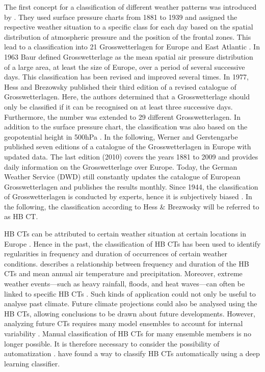 \documentclass[
]{krantz}
\begin{document}
The first concept for a classification of different weather patterns was introduced by \citet{Baur1944}.
They used surface pressure charts from 1881 to 1939 and assigned the respective weather situation to a specific class for each day based on the spatial distribution of atmospheric pressure and the position of the frontal zones.
This lead to a classification into 21 Grosswetterlagen for Europe and East Atlantic \citep{Baur1944}.
In 1963 Baur defined Grosswetterlage as the mean spatial air pressure distribution of a large area, at least the size of Europe, over a period of several successive days.
This classification has been revised and improved several times. In 1977, Hess and Brezowsky published their third edition of a revised catalogue of Grosswetterlagen.
Here, the authors determined that a Grosswetterlage should only be classified if it can be recognised on at least three successive days.
Furthermore, the number was extended to 29 different Grosswetterlagen.
In addition to the surface pressure chart, the classification was also based on the geopotential height in 500hPa \citep{Bissolli2001, Bissolli2001b, Werner2010}.
In the following, Werner and Gerstengarbe published seven editions of a catalogue of the Grosswetterlagen in Europe with updated data.
The last edition (2010) covers the years 1881 to 2009 and provides daily information on the Grosswetterlage over Europe.
Today, the German Weather Service (DWD) still constantly updates the catalogue of European Grosswetterlagen and publishes the results monthly.
Since 1944, the classification of Grosswetterlagen is conducted by experts, hence it is subjectively biased \citep{Hess2005katalog}.
In the following, the classification according to Hess \& Brezwosky will be referred to as HB CT.

HB CTs can be attributed to certain weather situation at certain locations in Europe \citep{Werner2010}.
Hence in the past, the classification of HB CTs has been used to identify regularities in frequency and duration of occurrences of certain weather conditions.
\citet{Bissolli2001} describes a relationship between frequency and duration of the HB CTs and mean annual air temperature and precipitation.
Moreover, extreme weather events---such as heavy rainfall, floods, and heat waves---can often be linked to specific HB CTs \citep{Mittermeier2022}.
Such kinds of application could not only be useful to analyse past climate.
Future climate projections could also be analysed using the HB CTs, allowing conclusions to be drawn about future developments.
However, analyzing future CTs requires many model ensembles to account for internal variability \citep{Wyser2021}.
Manual classification of HB CTs for many ensemble members is no longer possible.
It is therefore necessary to consider the possibility of automatization \citep{Mittermeier2022}.
\citet{Mittermeier2022} have found a way to classify HB CTs automatically using a deep learning classifier.
\end{document}

